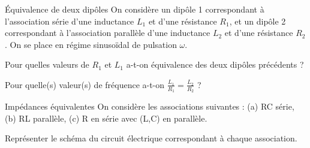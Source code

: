 
\begin{exo}[PCSI]{Équivalence de deux dipôles}
On considère un dipôle 1 correspondant à l'association série d'une inductance $L_1$ et d'une résistance $R_1$, et un dipôle 2 correspondant à l'association parallèle d'une inductance $L_2$ et d'une résistance $R_2$. On se place en régime sinusoïdal de pulsation $\omega$.
\begin{quest}
\item Pour quelles valeurs de $R_1$ et $L_1$ a-t-on équivalence des deux dipôles précédents ?
\item Pour quelle(s) valeur(s) de fréquence a-t-on $\frac{L_1}{R_1}=\frac{L_2}{R_2}$ ?
\end{quest}
\end{exo}

\begin{exo}[PC]{Impédances équivalentes}
On considère les associations suivantes : (a) RC série, (b) RL parallèle, (c) R en série avec (L,C) en parallèle.

\begin{quest}
	\item Représenter le schéma du circuit électrique correspondant à chaque association.


\end{quest}
\end{exo}

